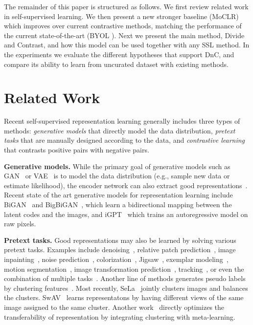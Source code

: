 \documentclass[final]{cvpr}
\newcommand\baseline{MoCLR}
\begin{document}
The remainder of this paper is structured as follows. We first review related work in self-supervised learning. We then present a new stronger baseline (\baseline{}) which improves over current contrastive methods, matching the performance of the current state-of-the-art (BYOL  \cite{grill2020bootstrap}). Next we present the main method, Divide and Contrast, and how this model can be used together with any SSL method. In the experiments we evaluate the different hypotheses that support DnC, and compare its ability to learn from uncurated dataset with existing methods. \section{Related Work}

Recent self-supervised representation learning generally includes three types of methods: \emph{generative models} that directly model the data distribution, \emph{pretext tasks} that are manually designed according to the data, and \emph{contrastive learning} that contrasts positive pairs with negative pairs.

\noindent\textbf{Generative models.} While the primary goal of generative models such as GAN~\cite{goodfellow2014generative,chen2016infogan} or VAE~\cite{kingma2013auto} is to model the data distribution (e.g., sample new data or estimate likelihood), the encoder network can also extract good representations~\cite{radford2015unsupervised}. Recent state of the art generative models for representation learning include BiGAN~\cite{donahue2016adversarial} and BigBiGAN~\cite{donahue2019large}, which learn a bidirectional mapping between the latent codes and the images, and iGPT~\cite{chen2020generative} which trains an autoregressive model on raw pixels.

\noindent\textbf{Pretext tasks.} Good representations may also be learned by solving various pretext tasks. Examples include denoising~\cite{vincent2008extracting}, relative patch prediction~\cite{doersch2015unsupervised}, image inpainting~\cite{pathak2016context}, noise prediction~\cite{bojanowski2017unsupervised}, colorization~\cite{zhang2016colorful,zhang2017split,vondrick2018tracking}, Jigsaw~\cite{noroozi2016unsupervised}, exemplar modeling~\cite{dosovitskiy2014discriminative}, motion segmentation~\cite{pathak2017learning}, image transformation prediction~\cite{gidaris2018unsupervised,zhang2019aet}, tracking~\cite{wang2015unsupervised}, or even the combination of multiple tasks~\cite{doersch2017multi}. Another line of methods generates pseudo labels by clustering features~\cite{caron2018deep,caron2019unsupervised,ji2019invariant,zhan2020online,alwassel2019self}. Most recently, SeLa~\cite{Asano2020} jointly clusters images and balances the clusters. SwAV~\cite{caron2020unsupervised} learns representatons by having different views of the same image assigned to the same cluster. Another work~\cite{hsu2018unsupervised} directly optimizes the transferability of representation by integrating clustering with meta-learning.
\end{document}
